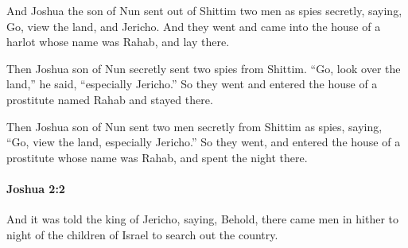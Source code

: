 			\begin{versebox}
					\item[BHS] 
					\item[ASV] And Joshua the son of Nun sent out of Shittim two men as spies secretly, saying, Go, view the land, and Jericho. And they went and came into the house of a harlot whose name was Rahab, and lay there.
					\item[NIV] Then Joshua son of Nun secretly sent two spies from Shittim. “Go, look over the land,” he said, “especially Jericho.” So they went and entered the house of a prostitute named Rahab and stayed there.
					\item[NRSV] Then Joshua son of Nun sent two men secretly from Shittim as spies, saying, “Go, view the land, especially Jericho.” So they went, and entered the house of a prostitute whose name was Rahab, and spent the night there.
			\end{versebox}

		\paragraph{Joshua 2:2} %
			\label{JOSHUA-2-2}

			And it was told the king of Jericho, saying, Behold, there came men in hither to night of the children of Israel to search out the country.


